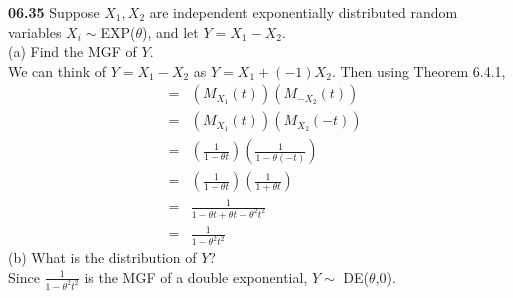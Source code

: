 {\bf 06.35}
Suppose $X_1, X_2$ are independent exponentially distributed random variables $X_i\sim$EXP($\theta$), and let $Y=X_1-X_2$.\\
(a) Find the MGF of $Y$.\\
We can think of $Y=X_1-X_2$ as $Y=X_1+(-1)X_2$. Then using Theorem 6.4.1,
\begin{eqnarray*}
 & = & (M_{X_1} (t))(M_{-X_2} (t))\\
 & = & (M_{X_1}(t))(M_{X_2}(-t))\\
 & = & \left(\frac{1}{1-\theta t}\right)\left(\frac{1}{1-\theta (-t)}\right)\\
 &=& \left(\frac{1}{1-\theta t}\right)\left(\frac{1}{1+\theta t}\right)\\
 & = & \frac{1}{1-\theta t +\theta t-\theta^2 t^2}\\
 & = & \frac{1}{1-\theta^2 t^2}
\end{eqnarray*}
(b) What is the distribution of $Y$?\\
Since $\frac{1}{1-\theta^2 t^2}$ is the MGF of a double exponential,  $Y\sim$ DE($\theta$,$0$).
\\
